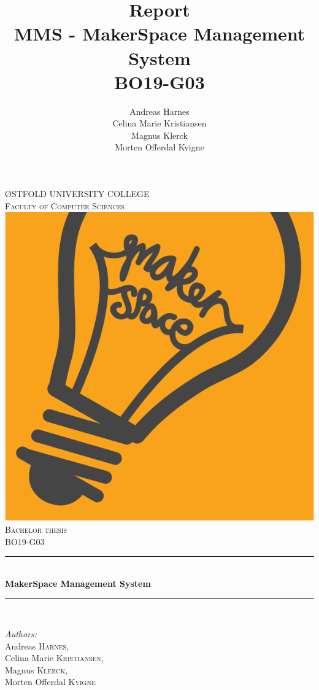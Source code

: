 \documentclass[12pt]{report}
\title {
    Report \\
    MMS - MakerSpace Management System \\
    BO19-G03
}
\author {
    Andreas Harnes \\
    Celina Marie Kristiansen \\
    Magnus Klerck \\
    Morten Offerdal Kvigne
}
\begin{document}
\begin{titlepage}

\newcommand{\HRule}{\rule{\linewidth}{0.5mm}} %

\center %

\textsc{\LARGE ØSTFOLD UNIVERSITY COLLEGE}\\[0.5cm] %
\textsc{\Large Faculty of Computer Sciences}\\[1.0cm]
\includegraphics[scale=.1]{figures/makerspace_logo.png}\\[1cm] %

\textsc{\Large Bachelor thesis}\\[0.5cm]
\textsc{\large BO19-G03}\\[0.5cm] %

\HRule \\[0.4cm]
{ \huge \bfseries MakerSpace Management System}\\%
\HRule \\[1.5cm]
 
\begin{minipage}{0.8\textwidth}
\begin{flushleft} \large
\emph{Authors:}\\
Andreas \textsc{Harnes},\\
Celina Marie \textsc{Kristiansen},\\
Magnus \textsc{Klerck},\\
Morten Offerdal \textsc{Kvigne}\\%
\end{flushleft}


\end{minipage}
\end{titlepage}
\end{document}
